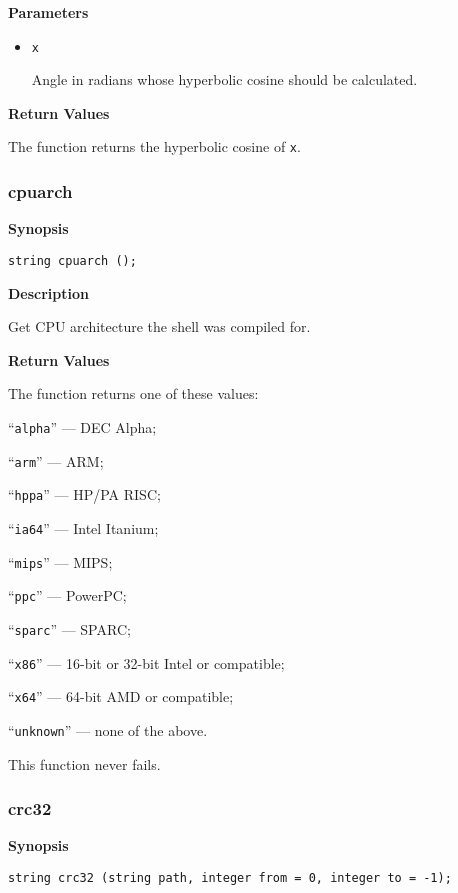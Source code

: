 \documentclass[a4paper, 10pt, titlepage]{article}
\begin{document}
\textbf{Parameters}

\begin{itemize}
\item \texttt{x}

Angle in radians whose hyperbolic cosine should be calculated.
\end{itemize}

\textbf{Return Values}

The function returns the hyperbolic cosine of \texttt{x}.

\subsubsection{cpuarch}

\textbf{Synopsis}

\begin{verbatim}
string cpuarch ();
\end{verbatim}

\textbf{Description}

Get CPU architecture the shell was compiled for.

\textbf{Return Values}

The function returns one of these values:
\begin{itemize*}
\item ``\texttt{alpha}'' --- DEC Alpha;
\item ``\texttt{arm}'' --- ARM;
\item ``\texttt{hppa}'' --- HP/PA RISC;
\item ``\texttt{ia64}'' --- Intel Itanium;
\item ``\texttt{mips}'' --- MIPS;
\item ``\texttt{ppc}'' --- PowerPC;
\item ``\texttt{sparc}'' --- SPARC;
\item ``\texttt{x86}'' --- 16-bit or 32-bit Intel or compatible;
\item ``\texttt{x64}'' --- 64-bit AMD or compatible;
\item ``\texttt{unknown}'' --- none of the above.
\end{itemize*}

This function never fails.

\subsubsection{crc32}

\textbf{Synopsis}

\begin{verbatim}
string crc32 (string path, integer from = 0, integer to = -1);
\end{verbatim}
\end{document}
